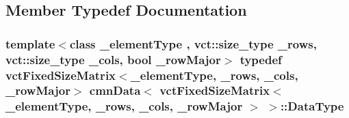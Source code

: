 \subsection{Member Typedef Documentation}
\hypertarget{classcmn_data_3_01vct_fixed_size_matrix_3_01__element_type_00_01__rows_00_01__cols_00_01__row_major_01_4_01_4_a6b06110fd1bb7049b72ce21275dd8aee}{
\subsubsection[{Data\-Type}]{\setlength{\rightskip}{0pt plus 5cm}template$<$class \-\_\-element\-Type , vct\-::size\-\_\-type \-\_\-rows, vct\-::size\-\_\-type \-\_\-cols, bool \-\_\-row\-Major$>$ typedef {\bf vct\-Fixed\-Size\-Matrix}$<$\-\_\-element\-Type, \-\_\-rows, \-\_\-cols, \-\_\-row\-Major$>$ {\bf cmn\-Data}$<$ {\bf vct\-Fixed\-Size\-Matrix}$<$ \-\_\-element\-Type, \-\_\-rows, \-\_\-cols, \-\_\-row\-Major $>$ $>$\-::{\bf Data\-Type}}}\label{classcmn_data_3_01vct_fixed_size_matrix_3_01__element_type_00_01__rows_00_01__cols_00_01__row_major_01_4_01_4_a6b06110fd1bb7049b72ce21275dd8aee}


